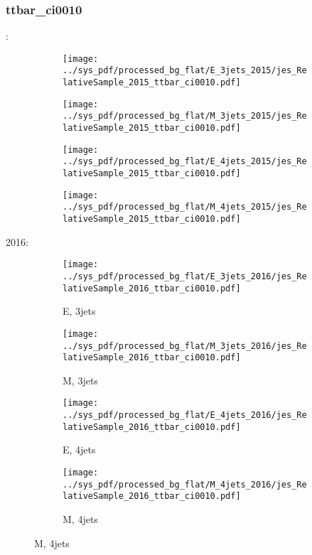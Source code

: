 \documentclass{beamer}
\begin{document}
\begin{frame}
\frametitle{ttbar_ci0010}
\fontsize{5}{1}:
\begin{figure}
\centering
\begin{subfigure}[b]{0.24\textwidth}
\texttt{[image: ../sys\_pdf/processed\_bg\_flat/E\_3jets\_2015/jes\_RelativeSample\_2015\_ttbar\_ci0010.pdf]}
\end{subfigure}
\begin{subfigure}[b]{0.24\textwidth}
\texttt{[image: ../sys\_pdf/processed\_bg\_flat/M\_3jets\_2015/jes\_RelativeSample\_2015\_ttbar\_ci0010.pdf]}
\end{subfigure}
\begin{subfigure}[b]{0.24\textwidth}
\texttt{[image: ../sys\_pdf/processed\_bg\_flat/E\_4jets\_2015/jes\_RelativeSample\_2015\_ttbar\_ci0010.pdf]}
\end{subfigure}
\begin{subfigure}[b]{0.24\textwidth}
\texttt{[image: ../sys\_pdf/processed\_bg\_flat/M\_4jets\_2015/jes\_RelativeSample\_2015\_ttbar\_ci0010.pdf]}
\end{subfigure}
\end{figure}
2016:
\begin{figure}
\centering
\begin{subfigure}[b]{0.24\textwidth}
\texttt{[image: ../sys\_pdf/processed\_bg\_flat/E\_3jets\_2016/jes\_RelativeSample\_2016\_ttbar\_ci0010.pdf]}
\captionsetup{font=tiny}
\caption{E, 3jets}
\end{subfigure}
\begin{subfigure}[b]{0.24\textwidth}
\texttt{[image: ../sys\_pdf/processed\_bg\_flat/M\_3jets\_2016/jes\_RelativeSample\_2016\_ttbar\_ci0010.pdf]}
\captionsetup{font=tiny}
\caption{M, 3jets}
\end{subfigure}
\begin{subfigure}[b]{0.24\textwidth}
\texttt{[image: ../sys\_pdf/processed\_bg\_flat/E\_4jets\_2016/jes\_RelativeSample\_2016\_ttbar\_ci0010.pdf]}
\captionsetup{font=tiny}
\caption{E, 4jets}
\end{subfigure}
\begin{subfigure}[b]{0.24\textwidth}
\texttt{[image: ../sys\_pdf/processed\_bg\_flat/M\_4jets\_2016/jes\_RelativeSample\_2016\_ttbar\_ci0010.pdf]}
\captionsetup{font=tiny}
\caption{M, 4jets}
\end{subfigure}
\end{figure}
\end{frame}
\end{document}
